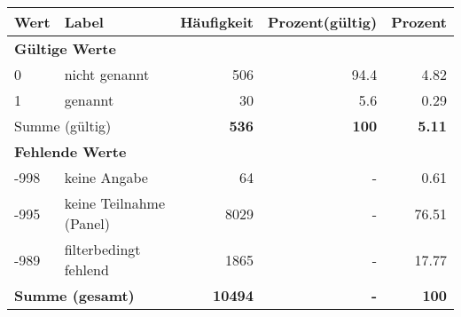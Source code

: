      \begin{longtable}{lXrrr}
     \toprule
     \textbf{Wert} & \textbf{Label} & \textbf{Häufigkeit} & \textbf{Prozent(gültig)} & \textbf{Prozent} \\
     \endhead
     \midrule
     \multicolumn{5}{l}{\textbf{Gültige Werte}}\\

     0 &
     \multicolumn{1}{X}{ nicht genannt   } &


       \num{506} &
       \num[round-mode=places,round-precision=2]{94.4} &
         \num[round-mode=places,round-precision=2]{4.82} \\

     1 &
     \multicolumn{1}{X}{ genannt   } &


       \num{30} &
       \num[round-mode=places,round-precision=2]{5.6} &
         \num[round-mode=places,round-precision=2]{0.29} \\
     \midrule
     \multicolumn{2}{l}{Summe (gültig)} &
       \textbf{\num{536}} &
     \textbf{\num{100}} &
       \textbf{\num[round-mode=places,round-precision=2]{5.11}} \\
     \multicolumn{5}{l}{\textbf{Fehlende Werte}}\\
       -998 &
       keine Angabe &
         \num{64} &
        - &
         \num[round-mode=places,round-precision=2]{0.61} \\
       -995 &
       keine Teilnahme (Panel) &
         \num{8029} &
        - &
         \num[round-mode=places,round-precision=2]{76.51} \\
       -989 &
       filterbedingt fehlend &
         \num{1865} &
        - &
         \num[round-mode=places,round-precision=2]{17.77} \\
     \midrule
     \multicolumn{2}{l}{\textbf{Summe (gesamt)}} &
          \textbf{\num{10494}} &
        \textbf{-} &
        \textbf{\num{100}} \\
     \bottomrule
     \end{longtable}
     
